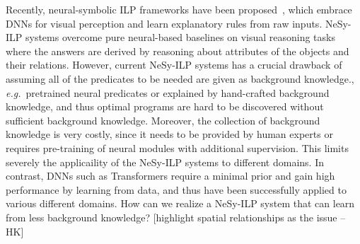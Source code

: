 \documentclass[
]{ceurart}
\newcommand{\hk}[1]{\textcolor{Apricot}{[#1 \textsc{--HK}]}}
\newcommand{\eg}{\emph{e.g.}~}
\begin{document}
	Recently, neural-symbolic ILP frameworks have been proposed~\cite{Evans2018,Shindo2023alphailp}, which embrace DNNs for visual perception and learn explanatory rules from raw inputs.
	NeSy-ILP systems overcome pure neural-based baselines on visual reasoning tasks where the answers are derived by reasoning about attributes of the objects and their relations.
	However, current NeSy-ILP systems has a crucial drawback of assuming all of the predicates to be needed are given as background knowledge., \eg pretrained neural predicates or explained by hand-crafted background knowledge, and thus
	optimal programs are hard to be discovered without sufficient background knowledge. 
	Moreover, the collection of background knowledge is very costly, since it needs to be provided by human experts or requires pre-training of neural modules with additional supervision.
	This limits severely the applicaility of the NeSy-ILP systems to different domains.
	In contrast, DNNs such as Transformers require a minimal prior and gain high performance by learning from data, and thus have been successfully applied to various different domains.
	How can we realize a NeSy-ILP system that can learn from less background knowledge?
	\hk{highlight spatial relationships as the issue}
	
\end{document}
